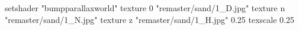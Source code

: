 setshader "bumpparallaxworld"
    texture 0 "remaster/sand/1_D.jpg"
    texture n "remaster/sand/1_N.jpg"
    texture z "remaster/sand/1_H.jpg" 0.25
    texscale 0.25